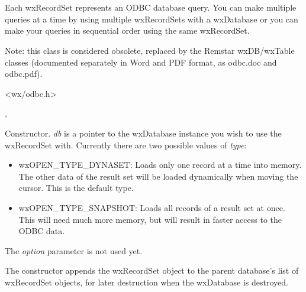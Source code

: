 \section{}\label{wxrecordset}

Each wxRecordSet represents an ODBC database query. You can make multiple queries
at a time by using multiple wxRecordSets with a wxDatabase or you can make
your queries in sequential order using the same wxRecordSet.

Note: this class is considered obsolete, replaced by the Remstar wxDB/wxTable classes
(documented separately in Word and PDF format, as odbc.doc and odbc.pdf).




<wx/odbc.h>


, 




Constructor. {\it db} is a pointer to the wxDatabase instance you wish to use the
wxRecordSet with. Currently there are two possible values of {\it type}:

\begin{itemize}\itemsep=0pt
\item wxOPEN\_TYPE\_DYNASET: Loads only one record at a time into memory. The other
data of the result set will be loaded dynamically when
moving the cursor. This is the default type.
\item wxOPEN\_TYPE\_SNAPSHOT: Loads all records of a result set at once. This will
need much more memory, but will result in
faster access to the ODBC data.
\end{itemize}

The {\it option} parameter is not used yet.

The constructor appends the wxRecordSet object to the parent database's list of
wxRecordSet objects, for later destruction when the wxDatabase is destroyed.


